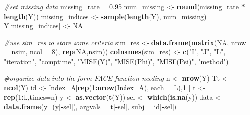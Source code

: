\documentclass[
]{article}
\newenvironment{Shaded}{\begin{snugshade}}{\end{snugshade}}
\newcommand{\AttributeTok}[1]{\textcolor[rgb]{0.13,0.29,0.53}{#1}}
\newcommand{\CommentTok}[1]{\textcolor[rgb]{0.56,0.35,0.01}{\textit{#1}}}
\newcommand{\ConstantTok}[1]{\textcolor[rgb]{0.56,0.35,0.01}{#1}}
\newcommand{\DecValTok}[1]{\textcolor[rgb]{0.00,0.00,0.81}{#1}}
\newcommand{\FloatTok}[1]{\textcolor[rgb]{0.00,0.00,0.81}{#1}}
\newcommand{\FunctionTok}[1]{\textcolor[rgb]{0.13,0.29,0.53}{\textbf{#1}}}
\newcommand{\NormalTok}[1]{#1}
\newcommand{\OtherTok}[1]{\textcolor[rgb]{0.56,0.35,0.01}{#1}}
\newcommand{\SpecialCharTok}[1]{\textcolor[rgb]{0.81,0.36,0.00}{\textbf{#1}}}
\newcommand{\StringTok}[1]{\textcolor[rgb]{0.31,0.60,0.02}{#1}}
\begin{document}
\begin{Shaded}
\begin{Highlighting}[]
\CommentTok{\#set missing data}
\NormalTok{  missing\_rate }\OtherTok{=} \FloatTok{0.95}
\NormalTok{  num\_missing }\OtherTok{\textless{}{-}} \FunctionTok{round}\NormalTok{(missing\_rate }\SpecialCharTok{*} \FunctionTok{length}\NormalTok{(Y))  }
\NormalTok{  missing\_indices }\OtherTok{\textless{}{-}} \FunctionTok{sample}\NormalTok{(}\FunctionTok{length}\NormalTok{(Y), num\_missing) }
\NormalTok{  Y[missing\_indices] }\OtherTok{\textless{}{-}} \ConstantTok{NA}  
  
\CommentTok{\#use sim\_res to store some criteria}
\NormalTok{sim\_res }\OtherTok{\textless{}{-}} \FunctionTok{data.frame}\NormalTok{(}\FunctionTok{matrix}\NormalTok{(}\ConstantTok{NA}\NormalTok{, }\AttributeTok{nrow =}\NormalTok{ nsim, }\AttributeTok{ncol =} \DecValTok{8}\NormalTok{), }\FunctionTok{rep}\NormalTok{(}\ConstantTok{NA}\NormalTok{,nsim))}
\FunctionTok{colnames}\NormalTok{(sim\_res) }\OtherTok{\textless{}{-}} \FunctionTok{c}\NormalTok{(}\StringTok{"I"}\NormalTok{, }\StringTok{"J"}\NormalTok{, }\StringTok{"L"}\NormalTok{, }\StringTok{"iteration"}\NormalTok{, }
                       \StringTok{"comptime"}\NormalTok{, }\StringTok{"MISE(Y)"}\NormalTok{, }\StringTok{"MISE(Phi)"}\NormalTok{, }\StringTok{"MISE(Psi)"}\NormalTok{, }\StringTok{"method"}\NormalTok{)}

\CommentTok{\#organize data into the form FACE function needing}
\NormalTok{n }\OtherTok{\textless{}{-}} \FunctionTok{nrow}\NormalTok{(Y)}
\NormalTok{Tt }\OtherTok{\textless{}{-}} \FunctionTok{ncol}\NormalTok{(Y)}
\NormalTok{id }\OtherTok{\textless{}{-}}\NormalTok{ Index\_A[}\FunctionTok{rep}\NormalTok{(}\DecValTok{1}\SpecialCharTok{:}\FunctionTok{nrow}\NormalTok{(Index\_A), }\AttributeTok{each =}\NormalTok{ L),}\DecValTok{1}\NormalTok{ ]  }
\NormalTok{t }\OtherTok{\textless{}{-}} \FunctionTok{rep}\NormalTok{(}\DecValTok{1}\SpecialCharTok{:}\NormalTok{L,}\AttributeTok{times=}\NormalTok{n)}
\NormalTok{y }\OtherTok{\textless{}{-}} \FunctionTok{as.vector}\NormalTok{(}\FunctionTok{t}\NormalTok{(Y))}
\NormalTok{sel }\OtherTok{\textless{}{-}} \FunctionTok{which}\NormalTok{(}\FunctionTok{is.na}\NormalTok{(y))}
\NormalTok{data }\OtherTok{\textless{}{-}} \FunctionTok{data.frame}\NormalTok{(}\AttributeTok{y=}\NormalTok{(y[}\SpecialCharTok{{-}}\NormalTok{sel]),}
\AttributeTok{argvals =}\NormalTok{ t[}\SpecialCharTok{{-}}\NormalTok{sel],}
\AttributeTok{subj =}\NormalTok{ id[}\SpecialCharTok{{-}}\NormalTok{sel])}


\end{Highlighting}
\end{Shaded}
\end{document}
